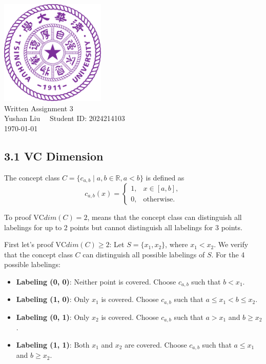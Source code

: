 \documentclass[12pt]{article}
\begin{document}
\begin{titlepage}
    \begin{center}
        \includegraphics[width=5cm]{tsinghua_logo.png}\\[4cm]  %
        {\Huge Written Assignment 3} \\[2cm]
        {\large Yushan Liu  \ \  Student ID: 2024214103}\\[6cm]
        {\normalsize \today}\\[1cm]

        \vfill
    \end{center}
\end{titlepage}


\subsection*{3.1 VC Dimension}

The concept class \( C = \{ c_{a,b} \mid a, b \in \mathbb{R}, a < b \} \) is defined as  
\[
c_{a,b}(x) = 
\begin{cases} 
1, & x \in [a, b], \\ 
0, & \text{otherwise}.
\end{cases}
\]  

To proof $\text{VC}dim(C)=2$, means that the concept class can distinguish all labelings 
for up to 2 points but cannot distinguish all labelings for 3 points.

First let's proof $\text{VC}dim(C)\ge 2$:
Let \( S = \{x_1, x_2\} \), where \( x_1 < x_2 \). We verify that the concept class \( C \) can distinguish all possible labelings of \( S \). For the 4 possible labelings:

\begin{itemize}
    \item \textbf{Labeling (0, 0)}: Neither point is covered. Choose \( c_{a,b} \) such that \( b < x_1 \).
    \item \textbf{Labeling (1, 0)}: Only \( x_1 \) is covered. Choose \( c_{a,b} \) such that \( a \leq x_1 < b \leq x_2 \).
    \item \textbf{Labeling (0, 1)}: Only \( x_2 \) is covered. Choose \( c_{a,b} \) such that \( a > x_1 \) and \( b \geq x_2 \).
    \item \textbf{Labeling (1, 1)}: Both \( x_1 \) and \( x_2 \) are covered. Choose \( c_{a,b} \) such that \( a \leq x_1 \) and \( b \geq x_2 \).
\end{itemize}
\end{document}
